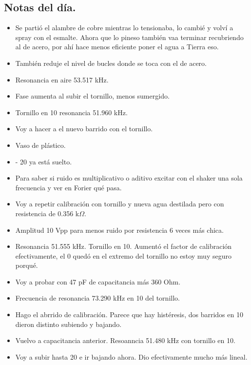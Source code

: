 \subsection*{Notas del día.}
\begin{itemize}
	\item Se partió el alambre de cobre mientras lo tensionaba, lo cambié y volví a spray con el esmalte. Ahora que lo pineso también vaa terminar recubriendo al de acero, por ahí hace menos eficiente poner el agua a Tierra eso. 
	\item También reduje el nivel de bucles donde se toca con el de acero. 
	
	\item Resonancia en aire 53.517 kHz. 
	\item Fase aumenta al subir el tornillo, menos sumergido. 
	\item Tornillo en 10 resonancia 51.960 kHz. 
	\item Voy a hacer a el nuevo barrido con el tornillo.  
	\item Vaso de plástico. 
	\item - 20 ya está suelto. 
	
	\item Para saber si ruido es multiplicativo o aditivo excitar con el shaker una sola frecuencia y ver en Forier qué pasa.
	
	\item Voy a repetir calibración con tornillo y nueva agua destilada pero con resistencia de 0.356 k$\Omega$.   
	\item Amplitud 10 Vpp para menos ruido por resistencia 6 veces más chica. 
	\item Resonancia 51.555 kHz. Tornillo en 10. Aumentó el factor de calibración efectivamente, el 0 quedó en el extremo del tornillo no estoy muy seguro porqué. 
	
	\item Voy a probar con 47 pF de capacitancia más 360 Ohm. 
	\item Frecuencia de resonancia 73.290 kHz en 10 del tornillo. 
	\item Hago el abrrido de calibración. Parece que hay histéresis, dos barridos en 10 dieron distinto subiendo y bajando.
	
	
	\item Vuelvo a capacitancia anterior. Resoanncia 51.480 kHz con tornillo en 10.
	\item Voy a subir hasta 20 e ir bajando ahora. Dio efectivamente mucho más lineal. 
	

\end{itemize}
